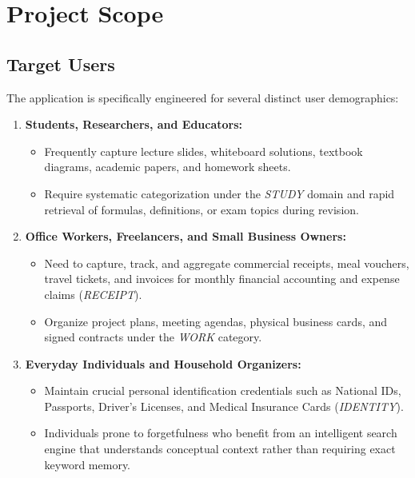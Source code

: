 \section{Project Scope}

\subsection{Target Users}
The application is specifically engineered for several distinct user demographics:
\begin{enumerate}
    \item \textbf{Students, Researchers, and Educators:}
    \begin{itemize}
        \item Frequently capture lecture slides, whiteboard solutions, textbook diagrams, academic papers, and homework sheets.
        \item Require systematic categorization under the \textit{STUDY} domain and rapid retrieval of formulas, definitions, or exam topics during revision.
    \end{itemize}
    \item \textbf{Office Workers, Freelancers, and Small Business Owners:}
    \begin{itemize}
        \item Need to capture, track, and aggregate commercial receipts, meal vouchers, travel tickets, and invoices for monthly financial accounting and expense claims (\textit{RECEIPT}).
        \item Organize project plans, meeting agendas, physical business cards, and signed contracts under the \textit{WORK} category.
    \end{itemize}
    \item \textbf{Everyday Individuals and Household Organizers:}
    \begin{itemize}
        \item Maintain crucial personal identification credentials such as National IDs, Passports, Driver's Licenses, and Medical Insurance Cards (\textit{IDENTITY}).
        \item Individuals prone to forgetfulness who benefit from an intelligent search engine that understands conceptual context rather than requiring exact keyword memory.
    \end{itemize}
\end{enumerate}

